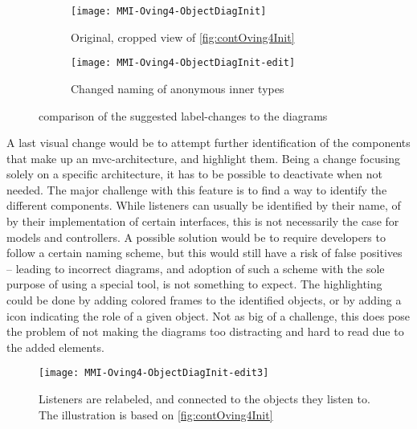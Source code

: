 \begin{figure}[H]
	\centering
	\begin{subfigure}{\textwidth}
		\centering
		\texttt{[image: MMI-Oving4-ObjectDiagInit]}
		\caption{Original, cropped view of \autoref{fig:contOving4Init}}
		\label{fig:contOving4ChangesLabA}
	\end{subfigure}
	\begin{subfigure}{\textwidth}
		\centering
		\texttt{[image: MMI-Oving4-ObjectDiagInit-edit]}
		\caption{Changed naming of anonymous inner types}
		\label{fig:contOving4ChangesLabB}
	\end{subfigure}
	\caption{comparison of the suggested label-changes to the diagrams}
	\label{fig:contOving4ChangesLab}
\end{figure}

A last visual change would be to attempt further identification of the components that make up an \gls{mvc}-architecture, and highlight them.
Being a change focusing solely on a specific architecture, it has to be possible to deactivate when not needed.
The major challenge with this feature is to find a way to identify the different components.
While listeners can usually be identified by their name, of by their implementation of certain interfaces, this is not necessarily the case for models and controllers.
A possible solution would be to require developers to follow a certain naming scheme, but this would still have a risk of false positives -- leading to incorrect diagrams, and adoption of such a scheme with the sole purpose of using a special tool, is not something to expect.
The highlighting could be done by adding colored frames to the identified objects, or by adding a icon indicating the role of a given object.
Not as big of a challenge, this does pose the problem of not making the diagrams too distracting and hard to read due to the added elements.
~\\

\begin{figure}[H]
	\centering
	\texttt{[image: MMI-Oving4-ObjectDiagInit-edit3]}
	\caption{Listeners are relabeled, and connected to the objects they listen to. The illustration is based on \autoref{fig:contOving4Init}}
	\label{fig:contOving4ChangesLink}
\end{figure}
~\\

